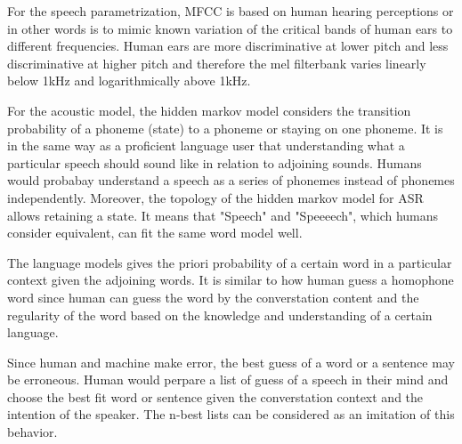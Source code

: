 \documentclass[12pt]{article}
\newenvironment{problem}[2][Problem]{\begin{trivlist}
\item[\hskip \labelsep {\bfseries #1}\hskip \labelsep {\bfseries #2.}]}{\end{trivlist}}
\begin{document}
\begin{problem}{1.2}
    For the speech parametrization, MFCC is based on human hearing perceptions or
    in other words is to mimic known variation of the critical bands of
    human ears to different frequencies. Human ears are more discriminative at
    lower pitch and less discriminative at higher pitch and therefore the mel
    filterbank varies linearly below 1kHz and logarithmically above 1kHz.

    For the acoustic model, the hidden markov model considers the transition
    probability of a phoneme (state) to a phoneme or staying on one phoneme.
    It is in the same way as a proficient language user that understanding
    what a particular speech should sound like in relation to adjoining sounds.
    Humans would probabay understand a speech as a series of phonemes instead of
    phonemes independently. Moreover, the topology of the hidden markov model 
    for ASR allows retaining a state. It means that "Speech" and "Speeeech",
    which humans consider equivalent, can fit the same word model well. 

    The language models gives the priori probability of a certain word in a
    particular context given the adjoining words. It is similar to how human
    guess a homophone word since human can guess the word by the converstation
    content and the regularity of the word based on the knowledge and understanding
    of a certain language.

    Since human and machine make error, the best guess of a word or a sentence may
    be erroneous. 
    Human would perpare a list of guess of a speech in their mind 
    and choose the best fit word or sentence given the converstation context and 
    the intention of the speaker. 
    The n-best lists can be considered as an imitation of this behavior.
\end{problem}
\end{document}
